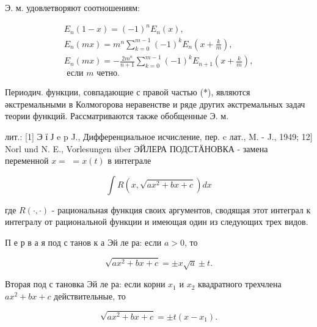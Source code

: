\documentclass[10pt]{article}
\begin{document}
Э. м. удовлетворяют соотношениям:



\[

\begin{gathered}

E_{n}(1-x)=(-1)^{n} E_{n}(x), \\

E_{n}(m x)=m^{n} \sum_{k=0}^{m-1}(-1)^{k} E_{n}\left(x+\frac{k}{m}\right), \\

E_{n}(m x)=-\frac{2 m^{n}}{n+1} \sum_{k=0}^{m-1}(-1)^{k} E_{n+1}\left(x+\frac{k}{m}\right), \\

\text { если } m \text { четно. }

\end{gathered}

\]



Периодич. функции, совпадающие с правой частью (*), являются әкстремальными в Колмогорова неравенстве и ряде других әкстремальных задач теории функций. Рассматриваются также обобщенные Э. м.



лит.: [1] Э ї Ј e p J., Дифференциальное исчисление, пер. c лат., M. - J., 1949; 12$]$ Norl und N. E., Vorlesungen über ЭЙЛЕРА ПОДСТӒНОВКА - замена переменной $x=$ $=x(t)$ в интеграле



\[

\int R\left(x, \sqrt{a x^{2}+b x+c}\right) d x

\]



где $R(\cdot, \cdot)$ - рациональная функция своих аргументов, сводящая этот интеграл к интегралу от рациональной функции и имеющая один из следующих трех видов.



П е р в а я под с танов к а Эй ле ра: если $a>0$, то



\[

\sqrt{a x^{2}+b x+c}= \pm x \sqrt{a} \pm t .

\]



Вторая под с тановка Эй ле ра: если корни $x_{1}$ и $x_{2}$ квадратного трехчлена $a x^{2}+b x+c$ действительные, то



\[

\sqrt{a x^{2}+b x+c}= \pm t\left(x-x_{1}\right) .

\]
\end{document}
